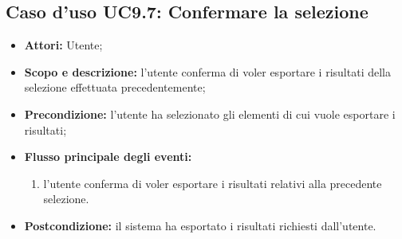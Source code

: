 \subsection{Caso d'uso UC9.7: Confermare la selezione}
\begin{itemize}
\item \textbf{Attori:} Utente;
\item \textbf{Scopo e descrizione:} l'utente conferma di voler esportare i risultati della selezione effettuata precedentemente;
\item \textbf{Precondizione:} l'utente ha selezionato gli elementi di cui vuole esportare i risultati;
\item \textbf{Flusso principale degli eventi:}
\begin{enumerate}
\item l'utente conferma di voler esportare i risultati relativi alla precedente selezione.
\end{enumerate}
\item \textbf{Postcondizione:} il sistema ha esportato i risultati richiesti dall'utente.
\end{itemize}

\pagebreak

